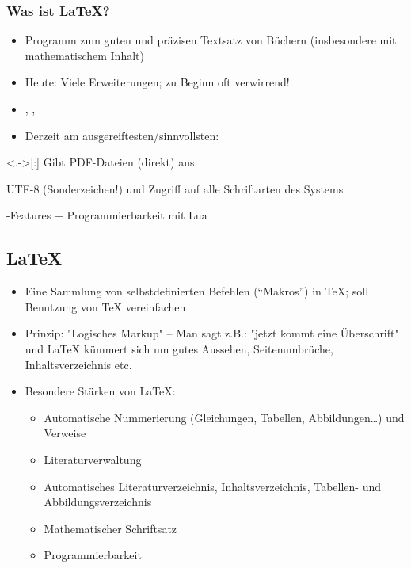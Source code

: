\begin{frame}[<+->]
	\frametitle{Was ist \LaTeX?}
	\begin{itemize}
	\item Programm zum guten und präzisen Textsatz von Büchern (insbesondere mit mathematischem Inhalt)
	\item Heute: Viele Erweiterungen; zu Beginn oft verwirrend!
	\item %
	, , 
	\item Derzeit am ausgereiftesten/sinnvollsten: 
	\end{itemize}
	\begin{block}{}
		\begin{description}
		\item<.->[:] Gibt PDF-Dateien (direkt) aus
		\item[\hologo{XeTeX}:] UTF-8 (Sonderzeichen!) und Zugriff auf alle Schriftarten des Systems
		\item[\hologo{LuaTeX}:] -Features + Programmierbarkeit mit Lua
		\end{description}
	\end{block}
\end{frame}

\subsection{\LaTeX}

\begin{frame}[<+->]
	\begin{itemize}
	\item Eine Sammlung von selbstdefinierten Befehlen (\enquote{Makros}) in \TeX; soll Benutzung von {\TeX} vereinfachen
	\item Prinzip: "Logisches Markup" -- Man sagt z.B.: "jetzt kommt eine Überschrift" und {\LaTeX} kümmert sich um gutes Aussehen, Seitenumbrüche, Inhaltsverzeichnis etc.
	\item Besondere Stärken von \LaTeX:
		\begin{itemize}
		\item Automatische Nummerierung (Gleichungen, Tabellen, Abbildungen\dots) und Verweise
		\item Literaturverwaltung
		\item Automatisches Literaturverzeichnis, Inhaltsverzeichnis, Tabellen- und Abbildungsverzeichnis
		\item Mathematischer Schriftsatz
		\item Programmierbarkeit
		\end{itemize}
	\end{itemize}
\end{frame}

